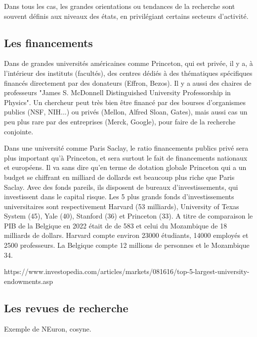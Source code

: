 \documentclass[24pt]{article}
\begin{document}
Dans tous les cas, les grandes orientations ou tendances de la recherche sont souvent définis aux niveaux des états, en privilégiant certains secteurs d'activité.









\subsection{Les financements}




Dans de grandes universités américaines comme Princeton, qui est privée, il y a, à l'intérieur des instituts (facultés), des centres dédiés à des thématiques spécifiques financés directement par des donateurs (Effron, Bezos). Il y a aussi des chaires de professeurs "James S. McDonnell Distinguished University Professorship in Physics". Un chercheur peut très bien être financé par des bourses d'organismes publics (NSF, NIH...) ou privés (Mellon, Alfred Sloan, Gates), mais aussi cas un peu plus rare par des entreprises (Merck, Google), pour faire de la recherche conjointe.   

Dans une université comme Paris Saclay, le ratio financements publics privé sera plus important qu'à Princeton, et sera surtout le fait de financements nationaux et européens. Il va sans dire qu'en terme de dotation globale Princeton qui a un budget se chiffrant en milliard de dollards est beaucoup plus riche que Paris Saclay. Avec des fonds pareils, ils disposent de bureaux d'investissements, qui 
investissent dans le capital risque.
Les 5 plus grands fonds d'investissements universitaires sont respectivement Harvard (53 milliards), University of Texas System (45), Yale (40), Stanford (36) et Princeton (33).
A titre de comparaison le PIB de la Belgique en 2022 était de de 583 et celui du Mozambique de 18 milliards de dollars. Harvard compte environ 23000 étudiants, 14000 employés et 2500 professeurs. La Belgique compte  
12 millions de personnes et le Mozambique 34.

https://www.investopedia.com/articles/markets/081616/top-5-largest-university-endowments.asp


\subsection{Les revues de recherche}

Exemple de NEuron, cosyne.
\end{document}

